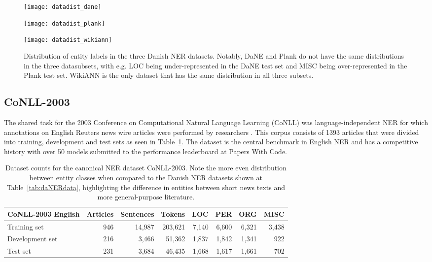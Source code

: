 \documentclass[main.tex]{subfiles}
\begin{document}
\begin{figure}[H]
    \centering
   	\begin{minipage}[t]{0.32\textwidth}
       \texttt{[image: datadist\_dane]}
    \end{minipage}\hfill
    \begin{minipage}[t]{0.32\textwidth}
        \texttt{[image: datadist\_plank]}
    \end{minipage}\hfill
    \begin{minipage}[t]{0.32\textwidth}
        \texttt{[image: datadist\_wikiann]}
    \end{minipage}
    \caption{
        Distribution of entity labels in the three Danish NER datasets.
        Notably, DaNE and Plank do not have the same distributions in the three datasubsets, with e.g. LOC being under-represented in the DaNE test set and MISC being over-represented in the Plank test set.
        WikiANN is the only dataset that has the same distribution in all three subsets.
    }
    \label{fig:dadatadist}
\end{figure}\noindent

\subsection{CoNLL-2003}
The shared task for the 2003 Conference on Computational Natural Language Learning (CoNLL) was language-independent NER for which annotations on English Reuters news wire articles were performed by researchers \cite{tjang2003conll}.
This corpus consists of 1393 articles that were divided into training, development and test sets as seen in Table~\ref{tab:conll2003}.
The dataset is the central benchmark in English NER \cite[Sec. 4.3]{yamada2020luke} and has a competitive history with over 50 models submitted to the performance leaderboard at Papers With Code\footnotemark.
\begin{table}[H]
    \centering
    \begin{tabular}{l|rrr|rrrr}
    CoNLL-2003 English  & Articles  & Sentences  & Tokens   & LOC   & PER   & ORG   & MISC  \\ \hline
    Training set        & 946       & 14,987     & 203,621  & 7,140  & 6,600  & 6,321  & 3,438   \\
    Development set     & 216       & 3,466      & 51,362   & 1,837  & 1,842  & 1,341  & 922    \\
    Test set            & 231       & 3,684      & 46,435   & 1,668  & 1,617  & 1,661  & 702    \\
    \end{tabular}
    \caption{
        Dataset counts for the canonical NER dataset CoNLL-2003.
        Note the more even distribution between entity classes when compared to the Danish NER datasets shown at Table~\ref{tab:daNERdata}, highlighting the difference in entities between short news texts and more general-purpose literature.
    }
    \label{tab:conll2003}
\end{table}
\end{document}
